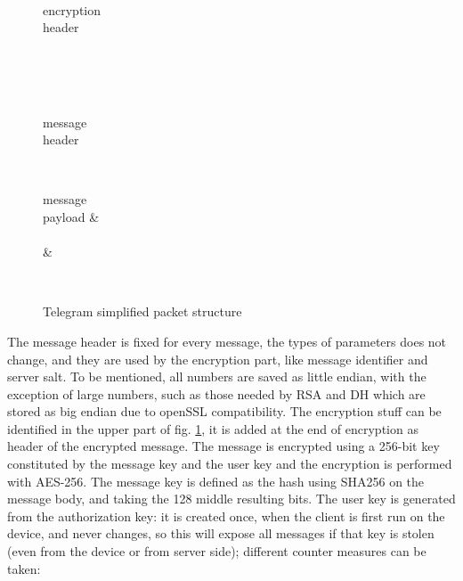\documentclass{article}
\begin{document}
\begin{figure}[H]
	\centering
	\begin{bytefield}[bitwidth=0.55em]{64}
		 \\
		\begin{rightwordgroup}{encryption \\ header}
			 \\
			 \\
		\end{rightwordgroup} \\
		\\
		\begin{rightwordgroup}{message \\ header}
			 \\
		\end{rightwordgroup}
		\\
		\begin{rightwordgroup}{message \\ payload}
			 &  \\
			 \\
			& 
		\end{rightwordgroup} \\
	\end{bytefield}
	\caption{Telegram simplified packet structure}
	\label{fig:tel_pack}
\end{figure}

The message header is fixed for every message, the types of parameters does not change, and they are used by the encryption part, like message identifier and server salt.\newline
To be mentioned, all numbers are saved as little endian, with the exception of large numbers, such as those needed by RSA and DH which are stored as big endian due to openSSL compatibility.\newline
The encryption stuff can be identified in the upper part of fig. \ref{fig:tel_pack}, it is added at the end of encryption as header of the encrypted message. The message is encrypted using a 256-bit key constituted by the message key and the user key and the encryption is performed with AES-256. The message key is defined as the hash using SHA256 on the message body, and taking the 128 middle resulting bits. The user key is generated from the authorization key: it is created once, when the client is first run on the device, and never changes, so this will expose all messages if that key is stolen (even from the device or from server side); different counter measures can be taken: 
\end{document}
